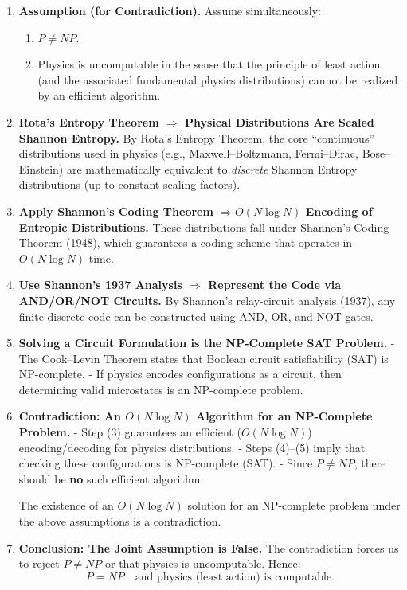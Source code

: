 \documentclass{report}
\begin{document}
\begin{enumerate}
    \item \textbf{Assumption (for Contradiction).}  
    Assume simultaneously:
    \begin{enumerate}
        \item \( P \neq NP \).
        \item Physics is uncomputable in the sense that the principle of least action (and the associated fundamental physics distributions) cannot be realized by an efficient algorithm.
    \end{enumerate}

    \item \textbf{Rota’s Entropy Theorem \( \Rightarrow \) Physical Distributions Are Scaled Shannon Entropy.}  
    By Rota’s Entropy Theorem, the core ``continuous'' distributions used in physics (e.g., Maxwell–Boltzmann, Fermi–Dirac, Bose–Einstein) are mathematically equivalent to \textit{discrete} Shannon Entropy distributions (up to constant scaling factors).

    \item \textbf{Apply Shannon’s Coding Theorem \( \Rightarrow O(N \log N) \) Encoding of Entropic Distributions.}  
    These distributions fall under Shannon’s Coding Theorem (1948), which guarantees a coding scheme that operates in \( O(N \log N) \) time. 

    \item \textbf{Use Shannon’s 1937 Analysis \( \Rightarrow \) Represent the Code via AND/OR/NOT Circuits.}  
    By Shannon’s relay-circuit analysis (1937), any finite discrete code can be constructed using AND, OR, and NOT gates.

    \item \textbf{Solving a Circuit Formulation is the NP-Complete SAT Problem.}  
    - The Cook–Levin Theorem states that Boolean circuit satisfiability (SAT) is NP-complete.
    - If physics encodes configurations as a circuit, then determining valid microstates is an NP-complete problem.

    \item \textbf{Contradiction: An \( O(N \log N) \) Algorithm for an NP-Complete Problem.}  
    - Step (3) guarantees an efficient (\( O(N \log N) \)) encoding/decoding for physics distributions.
    - Steps (4)–(5) imply that checking these configurations is NP-complete (SAT).
    - Since \( P \neq NP \), there should be \textbf{no} such efficient algorithm.

    The existence of an \( O(N \log N) \) solution for an NP-complete problem under the above assumptions is a contradiction.

    \item \textbf{Conclusion: The Joint Assumption is False.}  
    The contradiction forces us to reject \( P \neq NP \) or that physics is uncomputable. Hence:
    \[
    \boxed{P = NP \quad \text{and physics (least action) is computable.}}
    \]

\end{enumerate}
\end{document}
